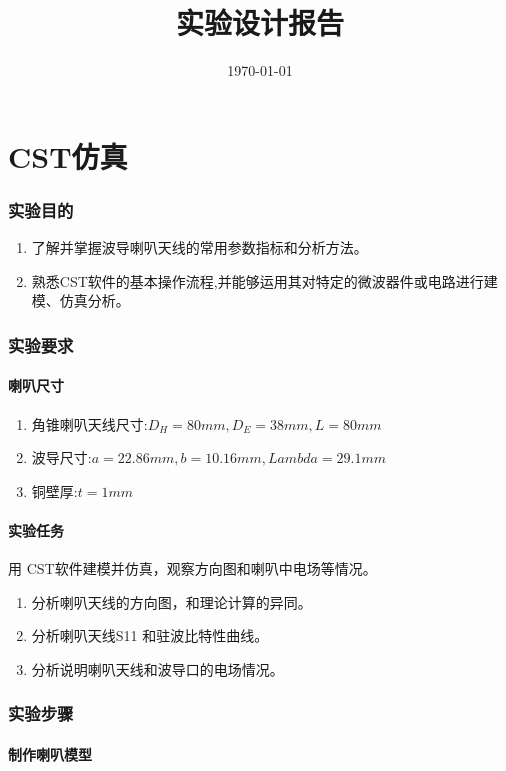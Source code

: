 \documentclass{../source/zjureport}
\title{实验设计报告}
\date{\today}
\begin{document}
    \makecover
    \makeheader
    
    \part{CST仿真}
    \section{实验目的}
        \begin{enumerate}
            \item 了解并掌握波导喇叭天线的常用参数指标和分析方法。
            \item 熟悉CST软件的基本操作流程,并能够运用其对特定的微波器件或电路进行建模、仿真分析。
        \end{enumerate}
    \section{实验要求}
        \subsection{喇叭尺寸}
        \begin{enumerate}
            \item 角锥喇叭天线尺寸:$D_H = 80mm , D_E = 38mm , L = 80mm$
            \item 波导尺寸:$a = 22.86mm , b = 10.16mm , Lambda = 29.1mm$
            \item 铜壁厚:$t = 1mm$
        \end{enumerate}
        \subsection{实验任务}
        用 CST软件建模并仿真，观察方向图和喇叭中电场等情况。
        \begin{enumerate}
            \item 分析喇叭天线的方向图，和理论计算的异同。
            \item 分析喇叭天线S11 和驻波比特性曲线。
            \item 分析说明喇叭天线和波导口的电场情况。
        \end{enumerate}

    \section{实验步骤}
        \subsection{制作喇叭模型}
        \newpage
\end{document}
